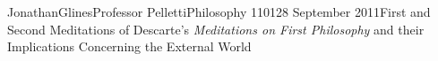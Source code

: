 \documentclass[12pt, letterpaper]{article}
\begin{document}
\begin{mla}{Jonathan}{Glines}{Professor Pelletti}{Philosophy 1101}{28 September 2011}{First and Second Meditations of Descarte's \textit{Meditations on First Philosophy} and their Implications Concerning the External World}

%
%
%
%
%
%
%
%
%




\end{mla}
\end{document}
